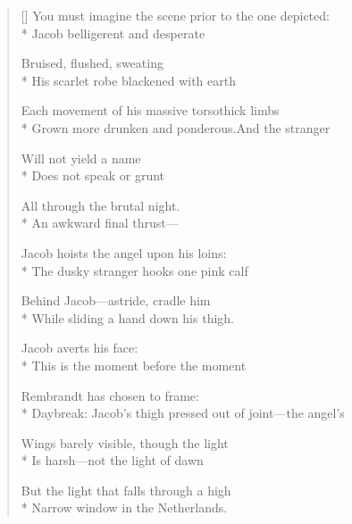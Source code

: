 \label{ch:rembrandt_wrestling}
\settowidth{\versewidth}{Daybreak:   Jacob's thigh pressed out of joint---the angel's}
\begin{verse}[\versewidth]
You must imagine the scene prior to the one depicted:\\*
Jacob belligerent and desperate

Bruised, flushed, sweating\\*
His scarlet robe blackened with earth

Each movement of his massive torso\qquad thick limbs\\*
Grown more drunken and ponderous.\qquad And the stranger

Will not yield a name\\*
Does not speak or grunt

All through the brutal night.\\*
An awkward final thrust---

Jacob hoists the angel upon his loins:\\*
The dusky stranger hooks one pink calf

Behind Jacob---astride, cradle him\\*
While sliding a hand down his thigh.

Jacob averts his face:\\*
This is the moment before the moment

Rembrandt has chosen to frame:\\*
Daybreak:   Jacob's thigh pressed out of joint---the angel's

Wings barely visible, though the light\\*
Is harsh---not the light of dawn

But the light that falls through a high\\*
Narrow window in the Netherlands.
\end{verse}
